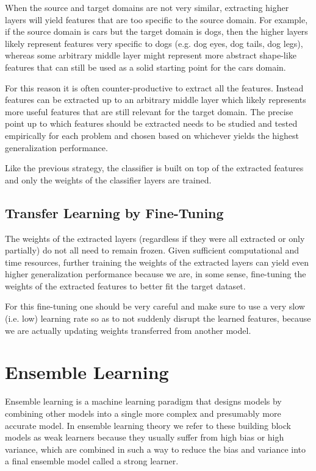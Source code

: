 When the source and target domains are not very similar, extracting higher layers will yield features that are too specific to the source domain. For example, if the source domain is cars but the target domain is dogs, then the higher layers likely represent features very specific to dogs (e.g. dog eyes, dog tails, dog legs), whereas some arbitrary middle layer might represent more abstract shape-like features that can still be used as a solid starting point for the cars domain.

For this reason it is often counter-productive to extract all the features. Instead features can be extracted up to an arbitrary middle layer which likely represents more useful features that are still relevant for the target domain. The precise point up to which features should be extracted needs to be studied and tested empirically for each problem and chosen based on whichever yields the highest generalization performance.

Like the previous strategy, the classifier is built on top of the extracted features and only the weights of the classifier layers are trained.

\subsection{Transfer Learning by Fine-Tuning}

The weights of the extracted layers (regardless if they were all extracted or only partially) do not all need to remain frozen. Given sufficient computational and time resources, further training the weights of the extracted layers can yield even higher generalization performance because we are, in some sense, fine-tuning the weights of the extracted features to better fit the target dataset.

For this fine-tuning one should be very careful and make sure to use a very slow (i.e. low) learning rate so as to not suddenly disrupt the learned features, because we are actually updating weights transferred from another model.

\section{Ensemble Learning}

Ensemble learning is a machine learning paradigm that designs models by combining other models into a single more complex and presumably more accurate model. In ensemble learning theory we refer to these building block models as weak learners because they usually suffer from high bias or high variance, which are combined in such a way to reduce the bias and variance into a final ensemble model called a strong learner.

